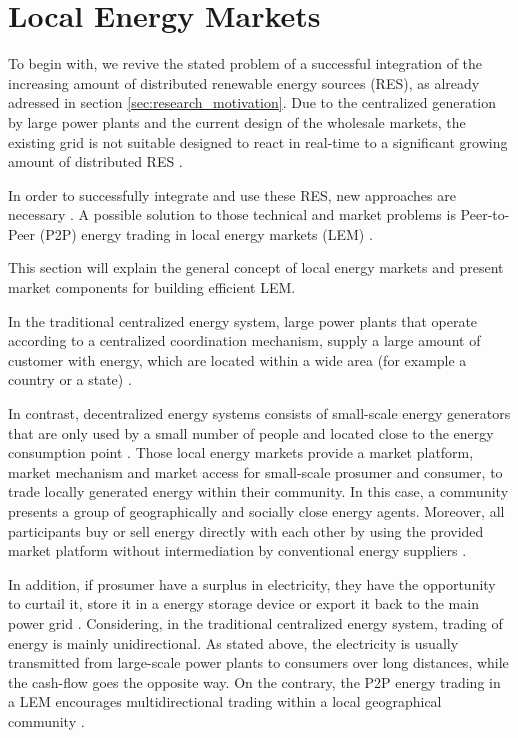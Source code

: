 \section{Local Energy Markets}
\label{sec:lem}

To begin with, we revive the stated problem of a successful integration of the increasing amount of
distributed renewable energy sources (RES), as already adressed 
in section \ref{sec:research_motivation}. Due to the centralized generation by large power plants
and the current design of the wholesale markets, the existing grid is not suitable designed
to react in real-time to a significant growing 
amount of distributed RES  .

In order to successfully integrate and use these RES, new approaches are necessary .
A possible solution to those technical and market problems is Peer-to-Peer (P2P) energy 
trading in local energy markets (LEM) . 

This section will explain the general concept of local energy markets 
and present market components for building efficient LEM. 

In the traditional centralized energy system, large power plants that operate according to a
centralized coordination mechanism, supply a large amount of customer with energy, which are located 
within a wide area (for example a country or a state) .

In contrast, decentralized energy systems consists of small-scale energy generators that are 
only used by a small number of people and located close to the energy consumption point .
Those local energy markets provide a market platform, market mechanism and market access
for small-scale prosumer and consumer, to trade locally generated energy within their community.
In this case, a community presents a group of geographically and socially close energy agents.
Moreover, all participants buy or sell energy directly with each other by using the provided market platform
without intermediation by conventional energy suppliers .

In addition, if prosumer have a surplus in electricity, they have the opportunity 
to curtail it, store it in a energy storage device or export it back to the main power grid .
Considering, in the traditional centralized energy system, trading of energy is mainly unidirectional.
As stated above, the electricity is usually transmitted from large-scale power plants to 
consumers over long distances, while the cash-flow goes the opposite way. 
On the contrary, the P2P energy trading in a LEM encourages multidirectional trading within 
a local geographical community .

